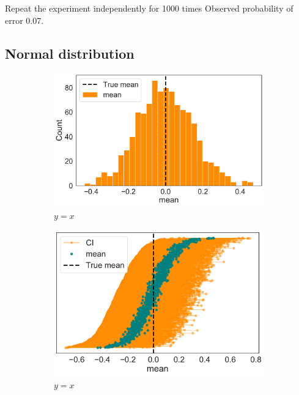\documentclass[twoside,onecolumn]{article}
\theoremstyle{definition}
\begin{document}
Repeat the experiment independently for 1000 times
Observed probability of error 0.07.
\subsection{Normal distribution}
\begin{figure} \centering
\begin{subfigure}{0.5\textwidth}
         \includegraphics[width=\textwidth]{../figs/mean_distr_norm.pdf}
         \caption{$y=x$}\label{fig:y equals x}
     \end{subfigure}
     \begin{subfigure}{0.45\textwidth}
         \includegraphics[width=\textwidth]{../figs/norm_mean_CI.pdf}
         \caption{$y=x$}
         \label{fig:y equals x}
     \end{subfigure}
  \caption{}\label{fig:ci_unif_mean}
\end{figure}
\end{document}
